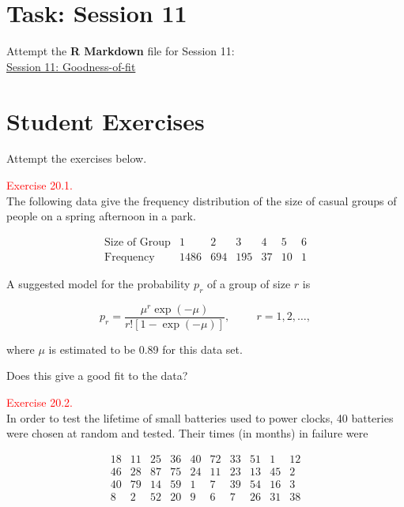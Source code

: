 \documentclass[
]{book}
\begin{document}
\hypertarget{Hypo_Test_Discrete:lab}{%
\section*{\texorpdfstring{{\textbf{Task: Session 11}}}{Task: Session 11}}\label{Hypo_Test_Discrete:lab}}

Attempt the \textbf{R Markdown} file for Session 11:\\
\href{https://moodle.nottingham.ac.uk/course/view.php?id=134982\#section-2}{Session 11: Goodness-of-fit}

\hypertarget{Hypo_Test_Discrete:exer}{%
\section*{\texorpdfstring{{\textbf{Student Exercises}}}{Student Exercises}}\label{Hypo_Test_Discrete:exer}}

Attempt the exercises below.

\hypertarget{exer20.1}{}
\textcolor{red}{Exercise 20.1.}\\
The following data give the frequency distribution of the size of casual groups of people on a spring afternoon in a park.

\[ \begin{array}{l|cccccc} \mbox{Size of Group} & 1 & 2 & 3 & 4 & 5 & 6 \\ \hline \mbox{Frequency} & 1486 & 694 & 195 & 37 & 10 & 1 \end{array} \]

A suggested model for the probability \(p_r\) of a group of size \(r\) is

\[ p_r = \frac{\mu^r \exp(-\mu)}{r! [1- \exp(-\mu)]}, \hspace{1cm} r=1,2,\ldots, \]

where \(\mu\) is estimated to be 0.89 for this data set.

Does this give a good fit to the data?

\hfill\break

\hypertarget{exer20.2}{}
\textcolor{red}{Exercise 20.2.}\\
In order to test the lifetime of small batteries used to power clocks, 40 batteries were chosen at random and tested. Their times (in months) in failure were

\[ \begin{array}{rrrrrrrrrr} 18& 11& 25& 36& 40& 72& 33& 51& 1& 12 \\
46& 28& 87& 75& 24& 11& 23& 13& 45& 2 \\
40& 79& 14& 59& 1& 7& 39& 54& 16& 3 \\
8& 2& 52& 20& 9& 6& 7& 26& 31& 38 \end{array} \]
\end{document}
